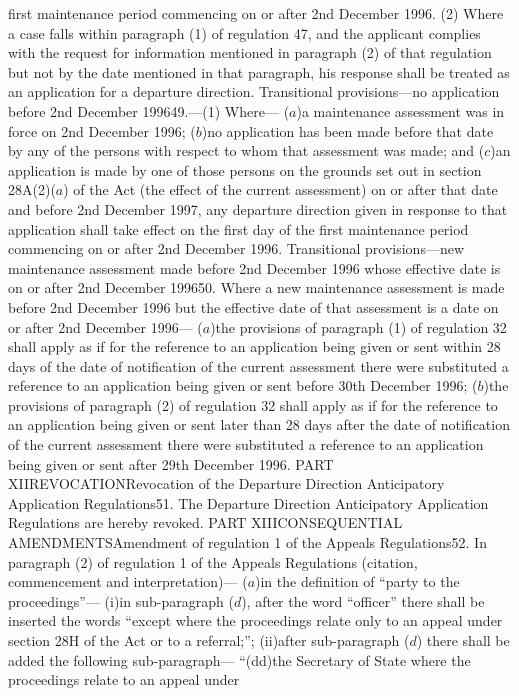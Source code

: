 \documentclass[a4paper]{article}
\begin{document}
first maintenance period commencing on or after 2nd December 1996.
(2) Where a case falls within paragraph (1) of regulation 47, and the applicant
complies with the request for information mentioned in paragraph (2) of that
regulation but not by the date mentioned in that paragraph, his response shall
be treated as an application for a departure direction.
Transitional provisions—no application before 2nd December 199649.—(1) Where—
($a$)a maintenance assessment was in force on 2nd December 1996;
($b$)no application has been made before that date by any of the persons with
respect to whom that assessment was made; and
($c$)an application is made by one of those persons on the grounds set out in
section 28A(2)($a$) of the Act (the effect of the current assessment) on or after
that date and before 2nd December 1997,
any departure direction given in response to that application shall take effect
on the first day of the first maintenance period commencing on or after 2nd
December 1996.
Transitional provisions—new maintenance assessment made before 2nd December 1996
whose effective date is on or after 2nd December 199650. Where a new maintenance
assessment is made before 2nd December 1996 but the effective date of that
assessment is a date on or after 2nd December 1996—
($a$)the provisions of paragraph (1) of regulation 32 shall apply as if for the
reference to an application being given or sent within 28 days of the date of
notification of the current assessment there were substituted a reference to an
application being given or sent before 30th December 1996;
($b$)the provisions of paragraph (2) of regulation 32 shall apply as if for the
reference to an application being given or sent later than 28 days after the
date of notification of the current assessment there were substituted a
reference to an application being given or sent after 29th December 1996.
PART XIIREVOCATIONRevocation of the Departure Direction Anticipatory Application
Regulations51. The Departure Direction Anticipatory Application Regulations are
hereby revoked.
PART XIIICONSEQUENTIAL AMENDMENTSAmendment of regulation 1 of the Appeals
Regulations52. In paragraph (2) of regulation 1 of the Appeals Regulations
(citation, commencement and interpretation)—
($a$)in the definition of “party to the proceedings”—
(i)in sub-paragraph ($d$), after the word “officer” there shall be inserted the
words “except where the proceedings relate only to an appeal under section 28H
of the Act or to a referral;”;
(ii)after sub-paragraph ($d$) there shall be added the following sub-paragraph—
“(dd)the Secretary of State where the proceedings relate to an appeal under
\end{document}
